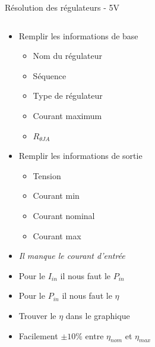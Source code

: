 \begin{frame}{Résolution des régulateurs - 5V}
    \begin{columns}
        \begin{column}{0.4\textwidth}
             {
                \begin{itemize}
                    \item Remplir les informations de base
                    \begin{itemize}
                        \item Nom du régulateur
                        \item Séquence
                        \item Type de régulateur
                        \item Courant maximum
                        \item $R_{\theta JA}$
                    \end{itemize}
                    \item Remplir les informations de sortie
                    \begin{itemize}
                        \item Tension
                        \item Courant min
                        \item Courant nominal
                        \item Courant max
                    \end{itemize}
                    \item \textit{Il manque le courant d'entrée}
                \end{itemize}
            }
             {
                \begin{itemize}
                    \item Pour le $I_{in}$ il nous faut le $P_{in}$
                    \item Pour le $P_{in}$ il nous faut le $\eta$
                \end{itemize}
            }
             {
                \begin{itemize}
                    \item Trouver le $\eta$ dans le graphique
                    \item Facilement $\pm 10\%$ entre $\eta_{nom}$ et $\eta_{max}$
                \end{itemize}
            }
             {
                \begin{center}

\end{center}}
\end{column}
\end{columns}
\end{frame}
